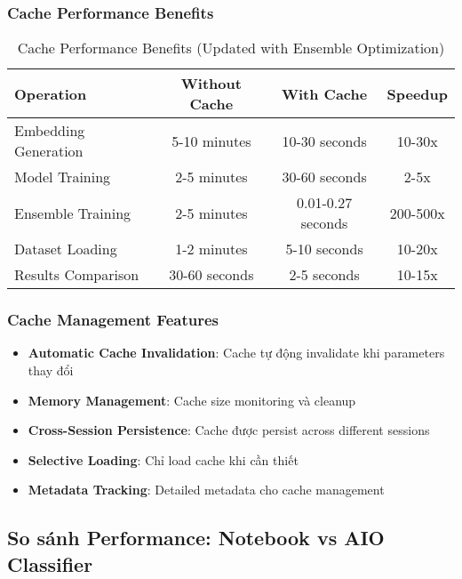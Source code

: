 \subsubsection{Cache Performance Benefits}

\begin{table}[H]
\centering
\begin{tabular}{|l|c|c|c|}
\hline
\textbf{Operation} & \textbf{Without Cache} & \textbf{With Cache} & \textbf{Speedup} \\
\hline
Embedding Generation & 5-10 minutes & 10-30 seconds & 10-30x \\
\hline
Model Training & 2-5 minutes & 30-60 seconds & 2-5x \\
\hline
Ensemble Training & 2-5 minutes & 0.01-0.27 seconds & 200-500x \\
\hline
Dataset Loading & 1-2 minutes & 5-10 seconds & 10-20x \\
\hline
Results Comparison & 30-60 seconds & 2-5 seconds & 10-15x \\
\hline
\end{tabular}
\caption{Cache Performance Benefits (Updated with Ensemble Optimization)}
\end{table}

\subsubsection{Cache Management Features}

\begin{itemize}
    \item \textbf{Automatic Cache Invalidation}: Cache tự động invalidate khi parameters thay đổi
    \item \textbf{Memory Management}: Cache size monitoring và cleanup
    \item \textbf{Cross-Session Persistence}: Cache được persist across different sessions
    \item \textbf{Selective Loading}: Chỉ load cache khi cần thiết
    \item \textbf{Metadata Tracking}: Detailed metadata cho cache management
\end{itemize}

\subsection{So sánh Performance: Notebook vs AIO Classifier}

